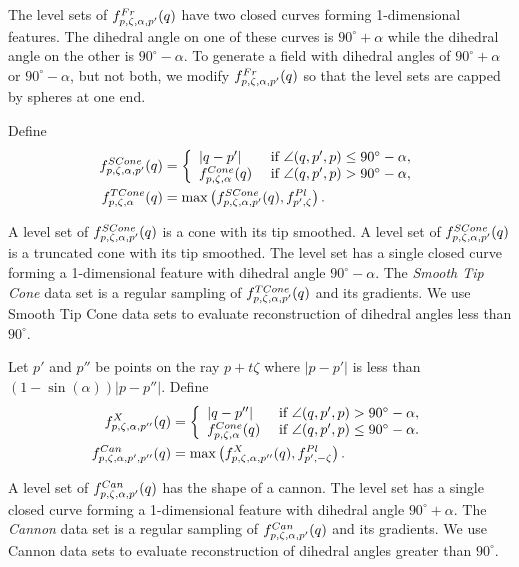 The level sets of $f^{Fr}_{p,\zeta,\alpha,p'}(q)$
have two closed curves forming 1-dimensional features.
The dihedral angle on one of these curves is $90^\circ + \alpha$
while the dihedral angle on the other is $90^\circ - \alpha$.
To generate a field with dihedral angles of $90^\circ + \alpha$
or $90^\circ - \alpha$, but not both,
we modify $f^{Fr}_{p,\zeta,\alpha,p'}(q)$ so that the level sets
are capped by spheres at one end.

Define
\begin{align*}
f^{SCone}_{p,\zeta,\alpha,p'}(q) & =
\left \{
\begin{array}{ll}
|q-p'| & \mbox{ if } \angle(q,p',p) \le 90^\circ - \alpha,\\
f^{Cone}_{p,\zeta,\alpha}(q) & \mbox{ if } 
  \angle(q,p',p) > 90^\circ - \alpha,
\end{array}
\right .
\\
f^{TCone}_{p,\zeta,\alpha}(q) & = 
\max \left ( f^{SCone}_{p,\zeta,\alpha,p'}(q), f^{Pl}_{p',\zeta} \right ).
\end{align*}

A level set of $f^{SCone}_{p,\zeta,\alpha,p'}(q)$ is a cone
with its tip smoothed.
A level set of $f^{SCone}_{p,\zeta,\alpha,p'}(q)$ is a truncated cone
with its tip smoothed.
The level set has a single closed curve forming a 1-dimensional feature
with dihedral angle $90^\circ - \alpha$.
The {\em Smooth Tip Cone} data set is a regular sampling
of $f^{TCone}_{p,\zeta,\alpha,p'}(q)$ and its gradients.
We use Smooth Tip Cone data sets to evaluate reconstruction
of dihedral angles less than $90^\circ$.

Let $p'$ and $p''$ be points on the ray $p + t \zeta$ where
$|p-p'|$ is less than $(1-\sin(\alpha)) |p-p''|$.
Define
\begin{align*}
f^{X}_{p,\zeta,\alpha,p''}(q) & =
\left \{
\begin{array}{ll}
|q-p''| & \mbox{ if } \angle(q,p',p) > 90^\circ - \alpha,\\
f^{Cone}_{p,\zeta,\alpha}(q) & \mbox{ if } \angle(q,p',p) \le 90^\circ - \alpha.
\end{array}
\right .
\\
f^{Can}_{p,\zeta,\alpha,p',p''}(q) & =
\max \left ( f^{X}_{p,\zeta,\alpha,p''}(q), f^{Pl}_{p',-\zeta} \right ) .
\end{align*}

A level set of $f^{Can}_{p,\zeta,\alpha,p'}(q)$ has the shape of a cannon.
The level set has a single closed curve forming a 1-dimensional feature
with dihedral angle $90^\circ + \alpha$.
The {\em Cannon} data set is a regular sampling
of $f^{Can}_{p,\zeta,\alpha,p'}(q)$ and its gradients.
We use Cannon data sets to evaluate reconstruction
of dihedral angles greater than $90^\circ$.




